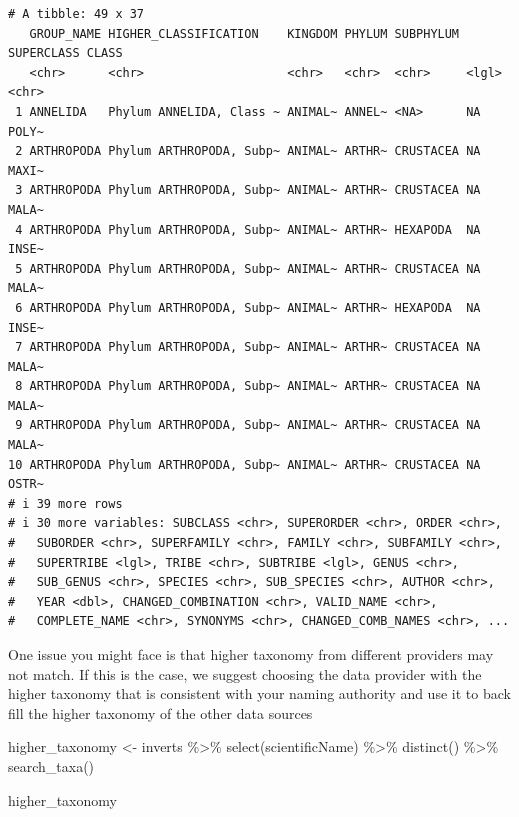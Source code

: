 \documentclass[
  letterpaper,
  DIV=11,
  numbers=noendperiod,
  oneside]{scrreprt}
\newenvironment{Shaded}{\begin{snugshade}}{\end{snugshade}}
\newcommand{\FunctionTok}[1]{\textcolor[rgb]{0.28,0.35,0.67}{#1}}
\newcommand{\NormalTok}[1]{\textcolor[rgb]{0.00,0.23,0.31}{#1}}
\newcommand{\OtherTok}[1]{\textcolor[rgb]{0.00,0.23,0.31}{#1}}
\newcommand{\SpecialCharTok}[1]{\textcolor[rgb]{0.37,0.37,0.37}{#1}}
\begin{document}
\begin{verbatim}
# A tibble: 49 x 37
   GROUP_NAME HIGHER_CLASSIFICATION    KINGDOM PHYLUM SUBPHYLUM SUPERCLASS CLASS
   <chr>      <chr>                    <chr>   <chr>  <chr>     <lgl>      <chr>
 1 ANNELIDA   Phylum ANNELIDA, Class ~ ANIMAL~ ANNEL~ <NA>      NA         POLY~
 2 ARTHROPODA Phylum ARTHROPODA, Subp~ ANIMAL~ ARTHR~ CRUSTACEA NA         MAXI~
 3 ARTHROPODA Phylum ARTHROPODA, Subp~ ANIMAL~ ARTHR~ CRUSTACEA NA         MALA~
 4 ARTHROPODA Phylum ARTHROPODA, Subp~ ANIMAL~ ARTHR~ HEXAPODA  NA         INSE~
 5 ARTHROPODA Phylum ARTHROPODA, Subp~ ANIMAL~ ARTHR~ CRUSTACEA NA         MALA~
 6 ARTHROPODA Phylum ARTHROPODA, Subp~ ANIMAL~ ARTHR~ HEXAPODA  NA         INSE~
 7 ARTHROPODA Phylum ARTHROPODA, Subp~ ANIMAL~ ARTHR~ CRUSTACEA NA         MALA~
 8 ARTHROPODA Phylum ARTHROPODA, Subp~ ANIMAL~ ARTHR~ CRUSTACEA NA         MALA~
 9 ARTHROPODA Phylum ARTHROPODA, Subp~ ANIMAL~ ARTHR~ CRUSTACEA NA         MALA~
10 ARTHROPODA Phylum ARTHROPODA, Subp~ ANIMAL~ ARTHR~ CRUSTACEA NA         OSTR~
# i 39 more rows
# i 30 more variables: SUBCLASS <chr>, SUPERORDER <chr>, ORDER <chr>,
#   SUBORDER <chr>, SUPERFAMILY <chr>, FAMILY <chr>, SUBFAMILY <chr>,
#   SUPERTRIBE <lgl>, TRIBE <chr>, SUBTRIBE <lgl>, GENUS <chr>,
#   SUB_GENUS <chr>, SPECIES <chr>, SUB_SPECIES <chr>, AUTHOR <chr>,
#   YEAR <dbl>, CHANGED_COMBINATION <chr>, VALID_NAME <chr>,
#   COMPLETE_NAME <chr>, SYNONYMS <chr>, CHANGED_COMB_NAMES <chr>, ...
\end{verbatim}

One issue you might face is that higher taxonomy from different
providers may not match. If this is the case, we suggest choosing the
data provider with the higher taxonomy that is consistent with your
naming authority and use it to back fill the higher taxonomy of the
other data sources

\begin{Shaded}
\begin{Highlighting}[]
\NormalTok{higher\_taxonomy }\OtherTok{\textless{}{-}}\NormalTok{ inverts }\SpecialCharTok{\%\textgreater{}\%}
  \FunctionTok{select}\NormalTok{(scientificName) }\SpecialCharTok{\%\textgreater{}\%} 
  \FunctionTok{distinct}\NormalTok{() }\SpecialCharTok{\%\textgreater{}\%} 
  \FunctionTok{search\_taxa}\NormalTok{()}

\NormalTok{higher\_taxonomy}
\end{Highlighting}
\end{Shaded}
\end{document}
